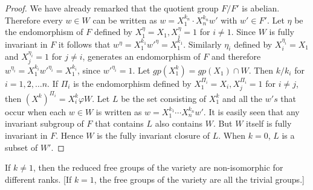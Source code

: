 \begin{proof}
  We have already remarked that the quotient group $F/F'$ is
  abe\-lian. Therefore every $w \in  W$ can be written as
  $w=X^{k_n}_1 \cdot X^{k_n}_n w'$ with $w' \in  F'$. Let
  $\eta$ be the endomorphism of $F$ defined by $X^\eta_1 = X_1,
  X^\eta_i = 1$ for $i \neq 1$. Since $W$ is fully invariant in $F$ it
  follows that $w^\eta = X^{k_1}_1 w'^{\eta}=X^{k_1}_1$. Similarly
  $\eta_i$ defined by $X^{\eta_i}_i = X_1$ and $X^{\eta_i}_j = 1$ for
  $j \neq i$, generates an endomorphism of $F$ and therefore
  $w^{\eta_i}=X_1^{k_i} w'^{\eta_i}= X^{k_i}_1$, since $w'^{\eta_i}=1$. Let
  $gp(X^k_1) = gp(X_1) \cap W$. Then $k/k_i$ for $i=1,2,\ldots n$. If
  $\Pi_i$ is the endomorphism defined by $X^{\Pi_i}_1 = X_i,
  X^{\Pi_i}_j = 1$ for $i \neq j$, then $(X^k)^{\Pi_i} = X^k_i \varphi
  W$. Let $L$ be the set consisting of $X^k_1$ and all the $w's$ that
  occur when each $w \in  W$ is written as $w = X^{k_1}_1
  \cdots X^{k_n}_n w'$. It is easily seen that any invariant subgroup
  of $F$ that contains $L$ also contains $W$. But $W$ itself is fully
  invariant in $F$. Hence $W$ is the fully invariant closure of
  $L$. When $k=0$, $L$ is a subset of $W'$. 
\end{proof}  
  
\begin{coro*}[B.M. Neumann, $1937^1$] 
  If $k \neq 1$, then the reduced free \break groups of the variety are
  non-isomorphic for different ranks. [If $k=1$, the free groups of
    the variety are all the trivial groups.] 
\end{coro*}  
